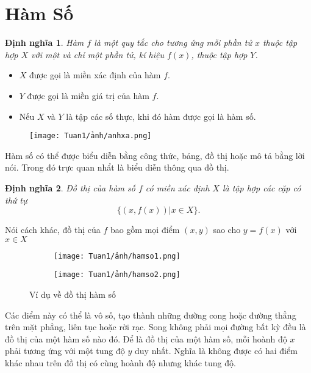 \newtheorem{definition}{Định nghĩa}[section]    
\newtheorem{theorem}{Định lý}
\newtheorem{corollary}[theorem]{Hệ quả}
\newtheorem{lemma}[theorem]{Bổ đề}

\section{Hàm Số}    
\begin{definition}
Hàm $f$ là một quy tắc cho tương ứng mỗi phần tử $x$ thuộc tập hợp $X$ với một và chỉ một phần tử, kí hiệu $f(x)$, thuộc tập hợp $Y$.
\end{definition}    
\begin{itemize}
    \item $X$ được gọi là miền xác định của hàm $f$.    
    \item $Y$ được gọi là miền giá trị của hàm $f$. 
    \item Nếu $X$ và $Y$ là tập các số thực, khi đó hàm được gọi là hàm số.
\end{itemize}

\begin{figure}[htbp]
    \centering
    \texttt{[image: Tuan1/ảnh/anhxa.png]}\label{anh1.1}
\end{figure}

Hàm số có thể được biểu diễn bằng công thức, bảng, đồ thị hoặc mô tả bằng lời nói. Trong đó trực quan nhẩt là biểu diễn thông qua đồ thị. 
\begin{definition}
    Đồ thị của hàm số $f$ có miền xác định $X$ là tập hợp các cặp có thứ tự  \[ \{\left(x,f(x)\right)\vert x\in X \} .\] 
\end{definition}
Nói cách khác, đồ thị của $f$ bao gồm mọi điểm $(x,y)$ sao cho $y=f(x)$ với $x\in X$
\begin{figure}[htbp]
    \centering
    \begin{subfigure}{0.4\textwidth}
        \centering
        \texttt{[image: Tuan1/ảnh/hamso1.png]}
        \caption{}
    \end{subfigure}
    \hfill
    \begin{subfigure}{0.5\textwidth}
        \centering
        \texttt{[image: Tuan1/ảnh/hamso2.png]}
        \caption{}
    \end{subfigure}
    \caption{Ví dụ về đồ thị hàm số}\label{anh1.2}
    \end{figure}

Các điểm này có thể là vô số, tạo thành những đường cong hoặc đường thẳng trên mặt phẳng, liên tục hoặc rời rạc. Song không phải mọi đường bất kỳ đều là đồ thị của một hàm số nào đó. Để là đồ thị của một hàm số, mỗi hoành độ $x$ phải tương ứng với một tung độ $y$ duy nhất. Nghĩa là không được có hai điểm khác nhau trên đồ thị có cùng hoành độ nhưng khác tung độ.


